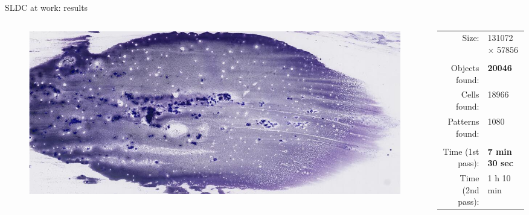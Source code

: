 \documentclass{beamer}
\begin{document}
\begin{frame}{SLDC at work: results}
	\footnotesize
	\begin{columns}
		\begin{column}{0.40\linewidth}
			\begin{figure}
				\center
				\vspace*{-1cm}
				\includegraphics[scale=0.25]{images/728725.png}
			\end{figure}
		\end{column}
		\begin{column}{0.47\linewidth}
			\begin{tabular}{rl}
				Size: & 131072 $\times$ 57856\\ 
				& \\
				Objects found: & \textbf{20046} \\
				Cells found: & 18966 \\
				Patterns found: & 1080 \\
				& \\
				Time (1st pass): & \textbf{7 min 30 sec} \\
				Time (2nd pass): & 1 h 10 min  \\
			\end{tabular}
		\end{column}
	\end{columns}
	

\end{frame}
\end{document}
